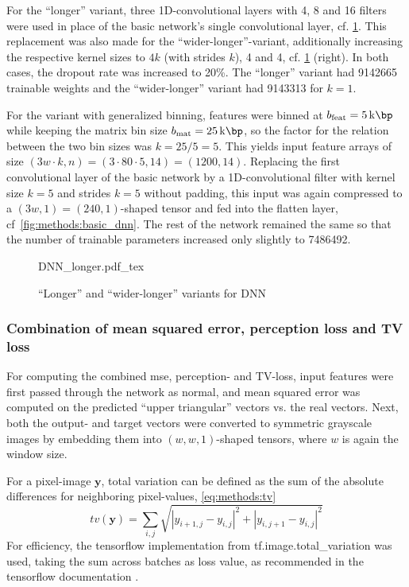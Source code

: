 For the ``longer'' variant, three 1D-convolutional layers with 4, 8 and 16 filters 
were used in place of the basic network's single convolutional layer, cf. \cref{fig:methods:longer_dnn}.
This replacement was also made for the ``wider-longer''-variant, 
additionally increasing the respective kernel sizes to $4k$ (with strides $k$), 4 and 4, cf. \cref{fig:methods:longer_dnn} (right).
In both cases, the dropout rate was increased to 20\%.
The ``longer'' variant had \SI{9142665}{} trainable weights and the ``wider-longer'' variant had \SI{9143313}{} for $k=1$.

For the variant with generalized binning, features were binned at $b_\textrm{feat} = \SI{5}{\kilo\bp}$ while keeping the matrix bin size $b_\textrm{mat} = \SI{25}{\kilo\bp}$,
so the factor for the relation between the two bin sizes was $k=25/5=5$.
This yields input feature arrays of size $(3w\cdot k, n) = (3\cdot80\cdot5 , 14) = (1200, 14)$.
Replacing the first convolutional layer of the basic network by a 1D-convolutional filter with kernel size $k=5$ and strides $k=5$ without padding,
this input was again compressed to a $(3w, 1) = (240, 1)$-shaped tensor and fed into the flatten layer, cf~\cref{fig:methods:basic_dnn}. 
The rest of the network remained the same so that the number of trainable parameters increased only slightly to \SI{7486492}{}.
\begin{figure}[p]
    \small
    \centering
    {DNN_longer.pdf_tex}
    \caption{``Longer'' and ``wider-longer'' variants for DNN}
    \label{fig:methods:longer_dnn}
\end{figure}

\subsubsection{Combination of mean squared error, perception loss and TV loss} \label{sec:methods:combined_loss}
For computing the combined \acrshort{mse}, perception- and TV-loss,
input features were first passed through the network as normal,
and mean squared error was computed on the predicted ``upper triangular'' vectors vs. the real vectors.
Next, both the output- and target vectors were converted to symmetric grayscale images by embedding them into 
$(w, w, 1)$-shaped tensors, where $w$ is again the window size.

For a pixel-image $\mathbf{y}$, total variation can be defined as the sum of the absolute differences for neighboring pixel-values, \cref{eq:methods:tv} \cite{Rudin1992, wikiTV2021}
\begin{equation}
 tv(\mathbf{y}) = \sum_{i,j}\sqrt{|y_{i+1,j} - y_{i,j}|^2 + |y_{i,j+1} - y_{i,j} |^2 } \label{eq:methods:tv}
\end{equation}
For efficiency, the tensorflow implementation from tf.image.total\_variation was used,
taking the sum across batches as loss value, as recommended in the tensorflow documentation \cite{TensorflowTV2020}.

